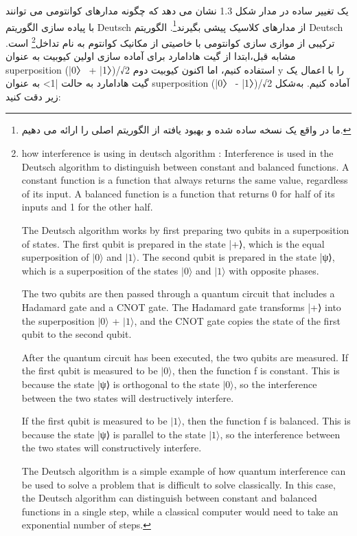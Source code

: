 \documentclass{book}
\begin{document}
 
یک تغییر ساده در مدار شکل 1.3 نشان می دهد که چگونه مدارهای کوانتومی می توانند با پیاده سازی الگوریتم Deutsch از مدارهای کلاسیک پیشی بگیرند\footnote{ما در واقع یک نسخه ساده شده و بهبود یافته از الگوریتم اصلی را ارائه می دهیم.}. الگوریتم Deutsch ترکیبی از موازی سازی کوانتومی با خاصیتی از مکانیک کوانتوم به نام تداخل\footnote{how interference is using in deutsch algorithm : Interference is used in the Deutsch algorithm to distinguish between constant and balanced functions. A constant function is a function that always returns the same value, regardless of its input. A balanced function is a function that returns 0 for half of its inputs and 1 for the other half.
	
	The Deutsch algorithm works by first preparing two qubits in a superposition of states. The first qubit is prepared in the state |+⟩, which is the equal superposition of $\vert 0 \rangle$ and $\vert 1 \rangle$. The second qubit is prepared in the state |ψ⟩, which is a superposition of the states $\vert 0 \rangle$ and $\vert 1 \rangle$ with opposite phases.
	
	The two qubits are then passed through a quantum circuit that includes a Hadamard gate and a CNOT gate. The Hadamard gate transforms |+⟩ into the superposition $\vert 0 \rangle$ + $\vert 1 \rangle$, and the CNOT gate copies the state of the first qubit to the second qubit.
	
	After the quantum circuit has been executed, the two qubits are measured. If the first qubit is measured to be $\vert 0 \rangle$, then the function f is constant. This is because the state |ψ⟩ is orthogonal to the state $\vert 0 \rangle$, so the interference between the two states will destructively interfere.
	
	If the first qubit is measured to be $\vert 1 \rangle$, then the function f is balanced. This is because the state |ψ⟩ is parallel to the state $\vert 1 \rangle$, so the interference between the two states will constructively interfere.
	
	The Deutsch algorithm is a simple example of how quantum interference can be used to solve a problem that is difficult to solve classically. In this case, the Deutsch algorithm can distinguish between constant and balanced functions in a single step, while a classical computer would need to take an exponential number of steps.} است.
مشابه قبل،‌ابتدا از گیت هادامارد برای آماده سازی اولین کیوبیت به عنوان superposition (|0〉 + |1〉)/√2 استفاده کنیم، اما اکنون کیوبیت دوم y را با اعمال یک گیت هادامارد به حالت |1> به عنوان superposition (|0〉 - |1〉)/√2 آماده کنیم. به‌شکل زیر دقت کنید:
\end{document}
